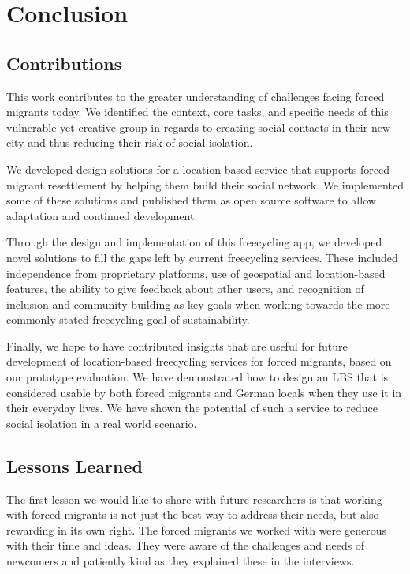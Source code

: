 \chapter{Conclusion}
\label{cha:conclusion}

\section{Contributions}

This work contributes to the greater understanding of challenges facing forced migrants today. We identified the context, core tasks, and specific needs of this vulnerable yet creative group in regards to creating social contacts in their new city and thus reducing their risk of social isolation.

We developed design solutions for a location-based service that supports forced migrant resettlement by helping them build their social network. We implemented some of these solutions and published them as open source software to allow adaptation and continued development.

Through the design and implementation of this freecycling app, we developed novel solutions to fill the gaps left by current freecycling services. These included independence from proprietary platforms, use of geospatial and location-based features, the ability to give feedback about other users, and recognition of inclusion and community-building as key goals when working towards the more commonly stated freecycling goal of sustainability.

Finally, we hope to have contributed insights that are useful for future development of location-based freecycling services for forced migrants, based on our prototype evaluation. We have demonstrated how to design an LBS that is considered usable by both forced migrants and German locals when they use it in their everyday lives. We have shown the potential of such a service to reduce social isolation in a real world scenario.

\section{Lessons Learned}

The first lesson we would like to share with future researchers is that working with forced migrants is not just the best way to address their needs, but also rewarding in its own right. The forced migrants we worked with were generous with their time and ideas. They were aware of the challenges and needs of newcomers and patiently kind as they explained these in the interviews.

